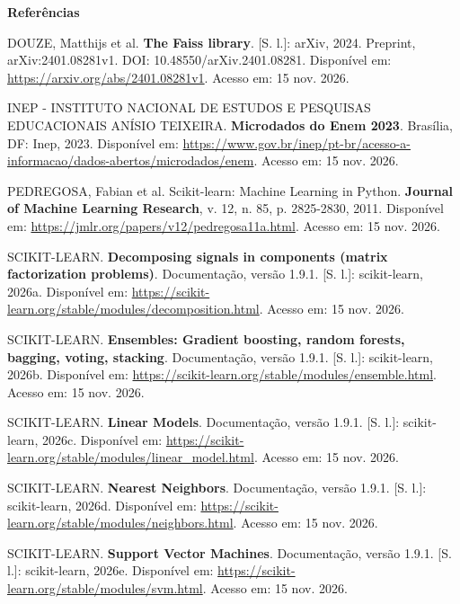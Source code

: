 \documentclass[12pt,a4paper]{article}
\begin{document}
\clearpage
\begin{center}\textbf{Referências}\end{center}
\begingroup\singlespacing\noindent DOUZE, Matthijs et al. \textbf{The Faiss library}. [S. l.]: arXiv, 2024. Preprint, arXiv:2401.08281v1. DOI: 10.48550/arXiv.2401.08281. Disponível em: \url{https://arxiv.org/abs/2401.08281v1}. Acesso em: 15 nov. 2026.\par\endgroup\vspace{6pt}
\begingroup\singlespacing\noindent INEP - INSTITUTO NACIONAL DE ESTUDOS E PESQUISAS EDUCACIONAIS ANÍSIO TEIXEIRA. \textbf{Microdados do Enem 2023}. Brasília, DF: Inep, 2023. Disponível em: \url{https://www.gov.br/inep/pt-br/acesso-a-informacao/dados-abertos/microdados/enem}. Acesso em: 15 nov. 2026.\par\endgroup\vspace{6pt}
\begingroup\singlespacing\noindent PEDREGOSA, Fabian et al. Scikit-learn: Machine Learning in Python. \textbf{Journal of Machine Learning Research}, v. 12, n. 85, p. 2825-2830, 2011. Disponível em: \url{https://jmlr.org/papers/v12/pedregosa11a.html}. Acesso em: 15 nov. 2026.\par\endgroup\vspace{6pt}
\begingroup\singlespacing\noindent SCIKIT-LEARN. \textbf{Decomposing signals in components (matrix factorization problems)}. Documentação, versão 1.9.1. [S. l.]: scikit-learn, 2026a. Disponível em: \url{https://scikit-learn.org/stable/modules/decomposition.html}. Acesso em: 15 nov. 2026.\par\endgroup\vspace{6pt}
\begingroup\singlespacing\noindent SCIKIT-LEARN. \textbf{Ensembles: Gradient boosting, random forests, bagging, voting, stacking}. Documentação, versão 1.9.1. [S. l.]: scikit-learn, 2026b. Disponível em: \url{https://scikit-learn.org/stable/modules/ensemble.html}. Acesso em: 15 nov. 2026.\par\endgroup\vspace{6pt}
\begingroup\singlespacing\noindent SCIKIT-LEARN. \textbf{Linear Models}. Documentação, versão 1.9.1. [S. l.]: scikit-learn, 2026c. Disponível em: \url{https://scikit-learn.org/stable/modules/linear_model.html}. Acesso em: 15 nov. 2026.\par\endgroup\vspace{6pt}
\begingroup\singlespacing\noindent SCIKIT-LEARN. \textbf{Nearest Neighbors}. Documentação, versão 1.9.1. [S. l.]: scikit-learn, 2026d. Disponível em: \url{https://scikit-learn.org/stable/modules/neighbors.html}. Acesso em: 15 nov. 2026.\par\endgroup\vspace{6pt}
\begingroup\singlespacing\noindent SCIKIT-LEARN. \textbf{Support Vector Machines}. Documentação, versão 1.9.1. [S. l.]: scikit-learn, 2026e. Disponível em: \url{https://scikit-learn.org/stable/modules/svm.html}. Acesso em: 15 nov. 2026.\par\endgroup\vspace{6pt}
\end{document}
